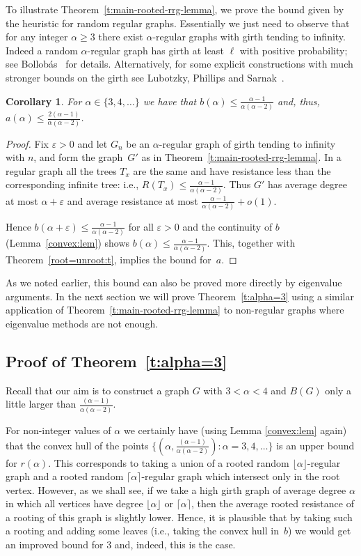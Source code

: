 \documentclass[11pt]{article}
\newtheorem{corollary}[theorem]{Corollary}
\theoremstyle{remark}
\def\a{\alpha}
\def\eps{\varepsilon}
\begin{document}
To illustrate Theorem~\ref{t:main-rooted-rrg-lemma}, we prove the bound given by the heuristic
for random regular graphs. Essentially we just need to observe that
for any integer $\a\ge 3$ there exist $\a$-regular graphs with girth
tending to infinity.  Indeed a random $\a$-regular graph has girth at
least $\ell$ with positive probability; see Bollob\'{a}s~\cite{MR1864966} for details. Alternatively, for some
explicit constructions with much stronger bounds on the girth see Lubotzky, Phillips and Sarnak~\cite{MR963118}. 

\begin{corollary}\label{rrr:cor}
For $\a\in\{3,4,\dots\}$ we have that
$b(\a)\leq\frac{\a-1}{\a(\a-2)}$ and, thus, $a(\a)\leq \frac{2(\a-1)}{\a(\a-2)}$.
\end{corollary}
\begin{proof}
  Fix $\eps>0$ and let $G_n$ be an $\a$-regular graph of girth tending
  to infinity with $n$, and form the graph~$G'$ as in
  Theorem~\ref{t:main-rooted-rrg-lemma}. In a regular graph all the
  trees $T_x$ are the same and have resistance less than the
  corresponding infinite tree: i.e., $R(T_x)\le
  \frac{\a-1}{\a(\a-2)}$. Thus $G'$ has average degree at most
  $\a+\eps$ and average resistance at most $
  \frac{\a-1}{\a(\a-2)}+o(1)$.

  Hence $b(\a+\eps)\leq\frac{\a-1}{\a(\a-2)}$ for all $\eps>0$ and the
  continuity of $b$ (Lemma~\ref{convex:lem}) shows $b(\a)\le
  \frac{\a-1}{\a(\a-2)}$.  This, together with
  Theorem~\ref{root=unroot:t}, implies the bound for~$a$.
\end{proof}

As we noted earlier, this bound can also be proved more directly by eigenvalue arguments. In the next section we will prove Theorem~\ref{t:alpha=3} using a similar application of Theorem~\ref{t:main-rooted-rrg-lemma} to non-regular graphs where
eigenvalue methods are not enough.

\subsection{Proof of Theorem~\ref{t:alpha=3}}

Recall that our aim is to construct a graph $G$ with $3<\a<4$ and $B(G)$ only a little larger than $\frac{(\a-1)}{\a(\a-2)}$. 

For non-integer values of $\a$ we certainly have (using Lemma
\ref{convex:lem} again) that the convex hull of the points
$\{(\a,\frac{(\a-1)}{\a(\a-2)}):\a=3,4,\dots \}$ is an upper bound for
$r(\a)$. This corresponds to taking a union of a rooted random
$\lfloor\a\rfloor$-regular graph and a rooted random
$\lceil\a\rceil$-regular graph which intersect only in the root
vertex. However, as we shall see, if we take a high girth graph of
average degree $\a$ in which all vertices have degree
$\lfloor\a\rfloor$ or $\lceil\a\rceil$, then the average rooted
resistance of a rooting of this graph is slightly lower. Hence, it is
plausible that by taking such a rooting and adding some leaves (i.e.,
taking the convex hull in~$b$) we would get an improved bound for
$3$ and, indeed, this is the case.
\end{document}
